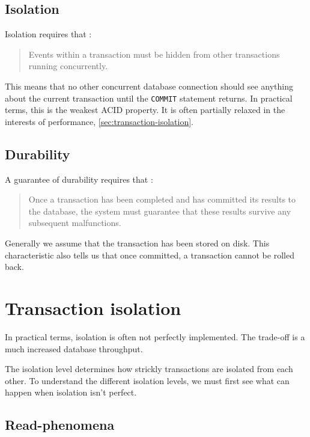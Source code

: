 \documentclass[slides]{pgnotes}
\begin{document}
\subsection{Isolation} 
\label{sec:isolation}

Isolation requires that \citep{haerder:1983:principles}:
\begin{quotation}
  Events within a transaction must be hidden from other transactions running concurrently.
\end{quotation}
This means that no other concurrent database connection should see anything about the current transaction until the \texttt{COMMIT} statement returns.
In practical terms, this is the weakest ACID property.
It is often partially relaxed in the interests of performance, \autoref{sec:transaction-isolation}.

\subsection{Durability} 
\label{sec:durability}

A guarantee of durability requires that \citep{haerder:1983:principles}:
\begin{quotation}
Once a transaction has been completed and has committed its results to the database, the system must guarantee that these results survive any subsequent malfunctions.
\end{quotation}
Generally we assume that the transaction has been stored on disk. 
This characteristic also tells us that once committed, a transaction cannot be rolled back.



\section{Transaction isolation}
\label{sec:transaction-isolation}

In practical terms, isolation is often not perfectly implemented.
The trade-off is a much increased database throughput.

The isolation level determines how strickly transactions are isolated from each other.
To understand the different isolation levels, we must first see what can happen when isolation isn't perfect.

\subsection{Read-phenomena}
\end{document}
